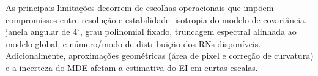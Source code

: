 As principais limitações decorrem de escolhas operacionais que impõem compromissos entre resolução e estabilidade: isotropia do modelo de covariância, janela angular de $4^\circ$, grau polinomial fixado, truncagem espectral alinhada ao modelo global, e número/modo de distribuição dos RNs disponíveis. Adicionalmente, aproximações geométricas (área de pixel e correção de curvatura) e a incerteza do MDE afetam a estimativa do EI em curtas escalas.


